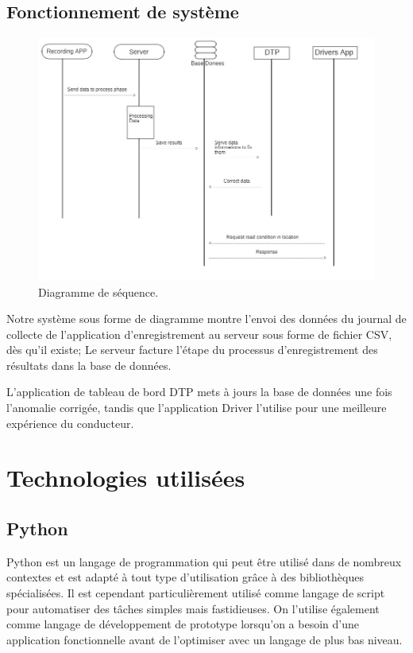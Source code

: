 \subsection{Fonctionnement de système}
\begin{figure}[ht]
    \center
    \includegraphics[width=1.2\textwidth]{Images/chapter3/diagrameSequence.jpg}
    \caption{Diagramme de séquence.}
    \label{fig:System}
\end{figure}

Notre système sous forme de diagramme montre l'envoi des données du journal de collecte de l'application d'enregistrement au serveur sous forme de fichier CSV, dès qu'il existe; Le serveur facture l'étape du processus d'enregistrement des résultats dans la base de données.

L'application de tableau de bord DTP mets à jours la base de données une fois l'anomalie corrigée, tandis que l'application Driver l'utilise pour une meilleure expérience du conducteur.



\section{Technologies utilisées}
\subsection{Python}
Python \cite{WelcomePythonOrg} est un langage de programmation qui peut être utilisé dans de nombreux contextes et est adapté à tout type d'utilisation grâce à des bibliothèques spécialisées. Il est cependant particulièrement utilisé comme langage de script pour automatiser des tâches simples mais fastidieuses. On l'utilise également comme langage de développement de prototype lorsqu'on a besoin d'une application fonctionnelle avant de l'optimiser avec un langage de plus bas niveau.

